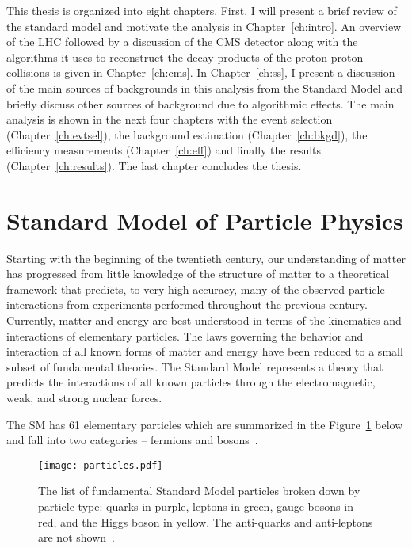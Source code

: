 This thesis is organized into eight chapters. First, I will present
a brief review of the standard model and motivate the analysis in
Chapter~\ref{ch:intro}. An overview of the LHC followed by a discussion of
the CMS detector along with the algorithms it uses to reconstruct the decay
products of the proton-proton collisions is given in Chapter~\ref{ch:cms}. In
Chapter~\ref{ch:ss}, I present a discussion of the main sources of backgrounds
in this analysis from the Standard Model and briefly discuss other sources
of background due to algorithmic effects. The main analysis is shown in the
next four chapters with the event selection (Chapter~\ref{ch:evtsel}), the
background estimation (Chapter~\ref{ch:bkgd}), the efficiency measurements
(Chapter~\ref{ch:eff}) and finally the results (Chapter~\ref{ch:results}). The
last chapter concludes the thesis.

\section{Standard Model of Particle Physics}
\label{sec:intro_sm}

Starting with the beginning of the twentieth century, our understanding of
matter has progressed from little knowledge of the structure of matter
to a theoretical framework that predicts, to very high accuracy, many of the
observed particle interactions from experiments performed throughout the
previous century. Currently, matter and energy are best understood in terms of
the kinematics and interactions of elementary particles. The laws governing
the behavior and interaction of all known forms of matter and energy have been
reduced to a small subset of fundamental theories. The Standard Model represents
a theory that predicts the interactions of all known particles through the
electromagnetic, weak, and strong nuclear forces.

The SM has 61 elementary particles which are summarized in the
Figure~\ref{fig:intro_particles} below and fall into two
categories -- fermions and bosons~\cite{halzen}.

\begin{figure}[tbhp]
\centering
\texttt{[image: particles.pdf]}
\caption[The list of fundamental Standard Model particles broken down by particle type]
{\label{fig:intro_particles}
The list of fundamental Standard Model particles broken down by particle type:
quarks in purple, leptons in green, gauge bosons in red, and the Higgs boson in
yellow. The anti-quarks and anti-leptons are not shown~\cite{wikiparticles}.
}
\end{figure}


